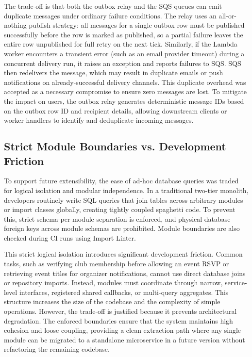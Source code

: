 The trade-off is that both the outbox relay and the SQS queues can emit duplicate messages under ordinary failure conditions. The relay uses an all-or-nothing publish strategy: all messages for a single outbox row must be published successfully before the row is marked as published, so a partial failure leaves the entire row unpublished for full retry on the next tick. Similarly, if the Lambda worker encounters a transient error (such as an email provider timeout) during a concurrent delivery run, it raises an exception and reports failures to SQS. SQS then redelivers the message, which may result in duplicate emails or push notifications on already-successful delivery channels. This duplicate overhead was accepted as a necessary compromise to ensure zero messages are lost. To mitigate the impact on users, the outbox relay generates deterministic message IDs based on the outbox row ID and recipient details, allowing downstream clients or worker handlers to identify and deduplicate incoming messages.

\subsection{Strict Module Boundaries vs. Development Friction}
To support future extensibility, the ease of ad-hoc database queries was traded for logical isolation and modular independence. In a traditional two-tier monolith, developers routinely write SQL queries that join tables across arbitrary modules or import classes globally, creating tightly coupled spaghetti code. To prevent this, strict schema-per-module separation is enforced, and physical database foreign keys across module schemas are prohibited. Module boundaries are also checked during CI runs using Import Linter.

This strict logical isolation introduces significant development friction. Common tasks, such as verifying club membership before allowing an event RSVP or retrieving event titles for organizer notifications, cannot use direct database joins or repository imports. Instead, modules must coordinate through narrow, service-level interfaces, registered shared callbacks, or multi-query aggregates. This structure increases the size of the codebase and the complexity of simple operations. However, the trade-off is justified because it prevents architectural degradation. The enforced boundaries ensure that the system maintains high cohesion and loose coupling, providing a clean extraction path where any single module can be migrated to a standalone microservice in a future version without refactoring the remaining codebase.